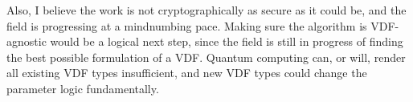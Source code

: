 Also, I believe the work is not cryptographically as secure as it could be, and the field is progressing at a mindnumbing pace. Making sure the algorithm is VDF-agnostic would be a logical next step, since the field is still in progress of finding the best possible formulation of a VDF. Quantum computing can, or will, render all existing VDF types insufficient, and new VDF types could change the parameter logic fundamentally.
